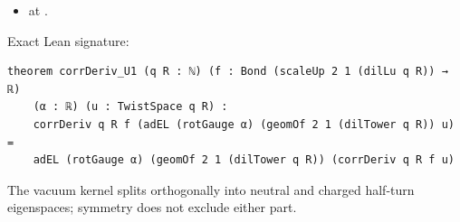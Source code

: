 \begin{theorem}[bp-134]
\begin{itemize}
\item \texttt{} at \texttt{}.
\end{itemize}
\par Exact Lean signature:
\begin{verbatim}
theorem corrDeriv_U1 (q R : ℕ) (f : Bond (scaleUp 2 1 (dilLu q R)) → ℝ)
    (α : ℝ) (u : TwistSpace q R) :
    corrDeriv q R f (adEL (rotGauge α) (geomOf 2 1 (dilTower q R)) u) =
    adEL (rotGauge α) (geomOf 2 1 (dilTower q R)) (corrDeriv q R f u)
\end{verbatim}
\end{theorem}

\begin{theorem}[bp-135]
\label{bp-135}
\uses{}
\leanok
The vacuum kernel splits orthogonally into neutral and charged half-turn eigenspaces; symmetry does not exclude either part.


\end{theorem}
